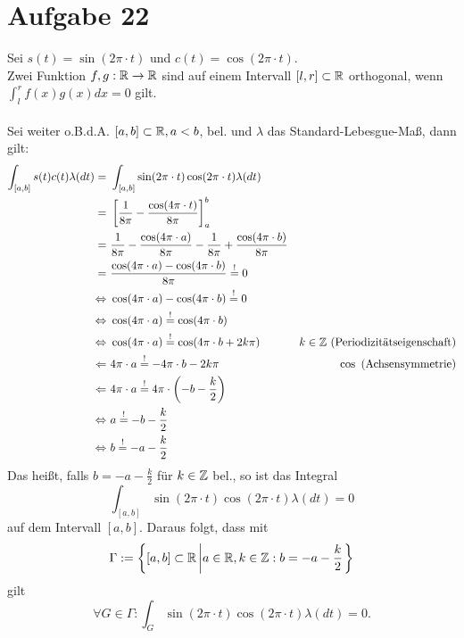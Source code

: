 

	\section*{Aufgabe 22}
		Sei $s(t) = \sin(2\pi\cdot t)$ und $c(t) = \cos(2\pi\cdot t)$.\\
		Zwei Funktion $f,g:{\mathbb R}\to{\mathbb R}$ sind auf einem Intervall $[l,r]\subset{\mathbb R}$ orthogonal, wenn $\int_l^rf(x)g(x)dx = 0$ gilt.\\
		\\
		Sei weiter o.B.d.A. $[a,b]\subset {\mathbb R}, a < b$, bel. und $\lambda$ das Standard-Lebesgue-Maß, dann gilt:
		\begin{align*}
			\int_{[a,b]} s(t)c(t)\lambda(dt) =\ & \int_{[a,b]}\sin(2\pi\cdot t)\cos(2\pi\cdot t)\lambda(dt)\\
			=\ & \left[\frac{1}{8\pi}-\frac{\cos(4\pi\cdot t)}{8\pi}\right]_a^b\\
			=\ & \frac{1}{8\pi}-\frac{\cos(4\pi\cdot a)}{8\pi}-\frac{1}{8\pi}+\frac{\cos(4\pi\cdot b)}{8\pi}\\
			=\ & \frac{\cos(4\pi\cdot a) - \cos(4\pi\cdot b)}{8\pi}\overset{!}{=} 0\\
			\Leftrightarrow\ & \cos(4\pi\cdot a) - \cos(4\pi\cdot b) \overset{!}{=} 0\\
			\Leftrightarrow\ & \cos(4\pi\cdot a) \overset{!}{=} \cos(4\pi\cdot b)\\
			\Leftrightarrow\ & \cos(4\pi\cdot a) \overset{!}{=} \cos(4\pi\cdot b + 2k\pi)	& k\in\Z\text{ (Periodizitätseigenschaft)}\\
			\Leftarrow\	& 4\pi \cdot a \overset{!}{=} -4\pi\cdot b - 2k\pi& \cos \text{ (Achsensymmetrie)}\\
			\Leftarrow\	& 4\pi \cdot a \overset{!}{=} 4\pi\cdot \left(-b  -\frac{k}{2}\right)\\
			\Leftrightarrow\ & a \overset{!}{=} -b  -\frac{k}{2}\\
			\Leftrightarrow\ & b \overset{!}{=} -a  -\frac{k}{2}
		\end{align*}
		Das heißt, falls $b = -a  -\frac{k}{2}$ für $k\in{\mathbb Z}$ bel., so ist das Integral
		$$\int_{[a,b]}\sin(2\pi\cdot t)\cos(2\pi\cdot t) \lambda(dt) = 0$$
		auf dem Intervall $[a,b]$.
		Daraus folgt, dass mit
		$$\Gamma := \left\lbrace [a,b]\subset {\mathbb R} \left| a\in{\mathbb R}, k\in{\mathbb Z}: b = -a  -\frac{k}{2} \right.\right\rbrace$$
		gilt 
		$$\forall G\in \Gamma:\int_G\sin(2\pi\cdot t)\cos(2\pi\cdot t) \lambda(dt) = 0.$$
\newpage
